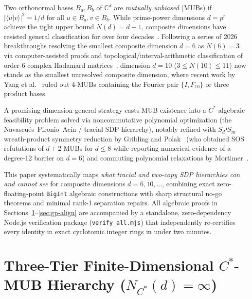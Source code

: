 \documentclass[11pt,a4paper]{article}
\theoremstyle{definition}
\newcommand{\C}{\mathbb{C}}
\begin{document}
Two orthonormal bases $B_a, B_b$ of $\C^d$ are \emph{mutually unbiased} (MUBs) if $|\langle u | v \rangle|^2 = 1/d$ for all $u \in B_a, v \in B_b$. While prime-power dimensions $d = p^r$ achieve the tight upper bound $N(d) = d + 1$, composite dimensions have resisted general classification for over four decades~\cite{McNultyWeigert2026}. Following a series of 2026 breakthroughs resolving the smallest composite dimension $d = 6$ as $N(6) = 3$ via computer-assisted proofs and topological/interval-arithmetic classification of order-6 complex Hadamard matrices~\cite{OpenAI2026,CardenesWuttigTindall2026,Jaswal2026}, dimension $d = 10$ ($3 \le N(10) \le 11$) now stands as the smallest unresolved composite dimension, where recent work by Yang et al.~\cite{YangEtAl2026} ruled out 4-MUBs containing the Fourier pair $\{I, F_{10}\}$ or three product bases.

A promising dimension-general strategy casts MUB existence into a $C^*$-algebraic feasibility problem solved via noncommutative polynomial optimization (the Navascu\'es--Pironio--Ac\'in / tracial SDP hierarchy), notably refined with $S_d \wr S_m$ wreath-product symmetry reduction by Gribling and Polak~\cite{GriblingPolak2024} (who obtained SOS refutations of $d+2$ MUBs for $d \le 8$ while reporting numerical evidence of a degree-12 barrier on $d=6$) and commuting polynomial relaxations by Mortimer~\cite{Mortimer2025}.

This paper systematically maps \emph{what tracial and two-copy SDP hierarchies can and cannot see} for composite dimensions $d = 6, 10, \dots$, combining exact zero-floating-point \texttt{BigInt} algebraic constructions with sharp structural no-go theorems and minimal rank-1 separation repairs. All algebraic proofs in Sections~\ref{sec:hierarchy}--\ref{sec:gp-align} are accompanied by a standalone, zero-dependency Node.js verification package (\texttt{verify\_all.mjs}) that independently re-certifies every identity in exact cyclotomic integer rings in under two minutes.

\section{Three-Tier Finite-Dimensional $C^*$-MUB Hierarchy ($N_{C^*}(d) = \infty$)}
\label{sec:hierarchy}
\end{document}
